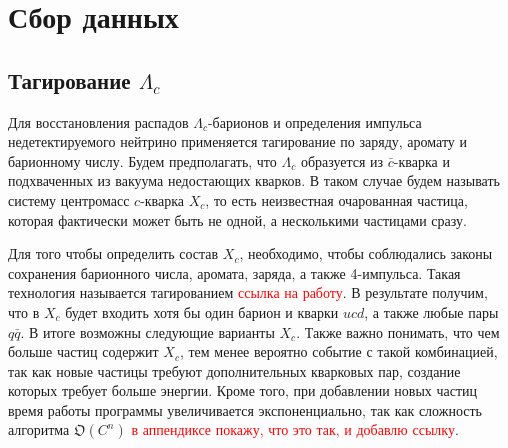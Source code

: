 \section{Сбор данных}

\subsection{Тагирование $\Lambda_c$}

Для восстановления распадов $\Lambda_c$-барионов и определения импульса недетектируемого нейтрино применяется тагирование по заряду, аромату и барионному числу. Будем предполагать, что $\Lambda_c$ образуется из $\bar{c}$-кварка и подхваченных из вакуума недостающих кварков. В таком случае будем называть систему центромасс $c$-кварка $X_c$, то есть неизвестная очарованная частица, которая фактически может быть не одной, а несколькими частицами сразу.

\begin{figure}[h!]
    \centering
\end{figure}

Для того чтобы определить состав $X_c$, необходимо, чтобы соблюдались законы сохранения барионного числа, аромата, заряда, а также 4-импульса. Такая технология называется тагированием \textcolor{red}{ссылка на работу}. В результате получим, что в $X_c$ будет входить хотя бы один барион и кварки $u c d$, а также любые пары $q \bar{q}$. В итоге возможны следующие варианты $X_c$. Также важно понимать, что чем больше частиц содержит $X_c$, тем менее вероятно событие с такой комбинацией, так как новые частицы требуют дополнительных кварковых пар, создание которых требует больше энергии. Кроме того, при добавлении новых частиц время работы программы увеличивается экспоненциально, так как сложность алгоритма $\mathfrak{O}(C^n)$ \textcolor{red}{в аппендиксе покажу, что это так, и добавлю ссылку}.

